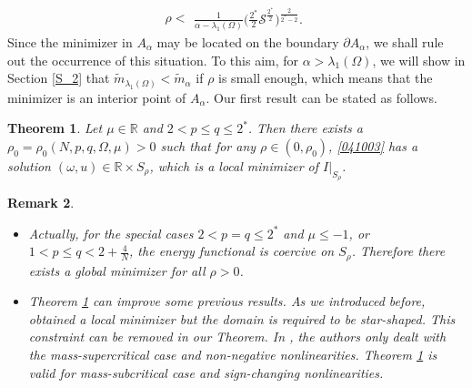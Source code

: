 \documentclass[10pt]{article}
\numberwithin{equation}{section}
\newtheorem{theorem}{Theorem}[section]
\newtheorem{remark}[theorem]{Remark}
\numberwithin{equation}{section}
\begin{document}
\begin{equation}\label{2505271451}
\rho<
\begin{aligned}
\frac{1}{\alpha-\lambda_1(\Omega)}\Big(\frac{2^{*}}{2}\mathcal{S}^{\frac{2^{*}}{2}}\Big)^{\frac{2}{2^{*}-2}}.
\end{aligned}
\end{equation}
Since the minimizer in $A_\alpha$ may be located on the boundary $\partial A_\alpha$, we shall rule out the occurrence of this situation. To this aim, for $\alpha>\lambda_1(\Omega)$, we will show in Section \ref{S_2} that $\widetilde{m}_{\lambda_1(\Omega)}<\widetilde{m}_{\alpha}$ if $\rho$ is small enough, which means that the minimizer is an interior point of $A_\alpha$. Our first result can be stated as follows.
\begin{theorem}\label{T041801}
Let $\mu\in \mathbb{R}$ and $2<p\le q\le  2^*$. Then there exists a $\rho_0=\rho_0(N,p,q,\Omega,\mu)>0$ such that
 for any $\rho\in(0,\rho_0)$,  \eqref{041003} has a solution $(\omega, u)\in\mathbb{R}\times S_\rho$, which is a local minimizer of $I|_{S_\rho}$.
\end{theorem}

\begin{remark}
\begin{itemize}
\item[\rm (i)] Actually, for the special cases $2<p=q\le 2^*$ and $\mu\le-1$, or $1<p\le q<2+\frac{4}{N}$, the energy functional is coercive on $S_\rho$. Therefore there exists a  global minimizer for all $\rho>0$.
\item[\rm (ii)] Theorem \ref{T041801} can improve some previous results. As we introduced before,  \cite{SZarxiv25} obtained a local minimizer but  the domain is required to be star-shaped. This constraint can be removed in our Theorem. In \cite{LZ25}, the authors only dealt with the mass-supercritical case and non-negative nonlinearities. Theorem \ref{T041801} is  valid for mass-subcritical case and sign-changing nonlinearities.
\end{itemize}
\end{remark}
\end{document}
